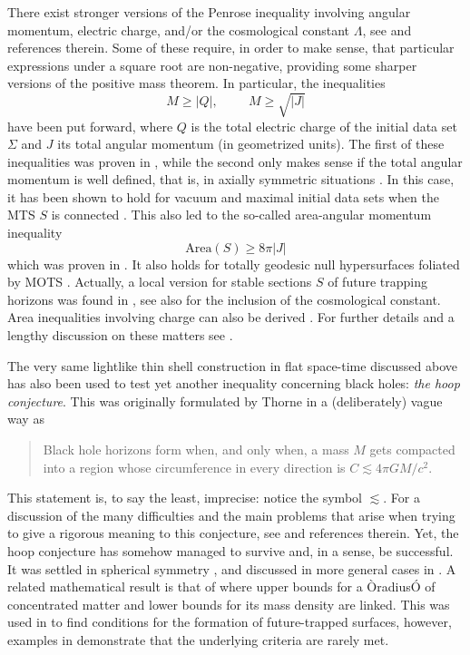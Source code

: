 \documentclass[12pt]{iopart}
\begin{document}
There exist stronger versions of the Penrose inequality involving angular momentum, electric charge, and/or the cosmological constant $\Lambda$, see \cite{Mars,Sza,JVG} and references therein. Some of these require, in order to make sense, that particular expressions under a square root are non-negative, providing some sharper versions of the positive mass theorem. In particular, the inequalities \cite{GHHP,H4,DLT,Dain}
$$
M\geq |Q| , \hspace{1cm} M\geq \sqrt{|J|}
$$
have been put forward, where $Q$ is the total electric charge of the initial data set $\Sigma$ and $J$ its total angular momentum (in geometrized units). The first of these inequalities was proven in \cite{GHHP,CRT}, while the second only makes sense if the total angular momentum is well defined, that is, in axially symmetric situations \cite{Dain,Dain2}. In this case, it has been shown to hold for vacuum and maximal initial data sets when the MTS $S$ is connected \cite{Dain1,CLW}.
This also led to the so-called area-angular momentum inequality \cite{AnP}
$$
\mbox{Area}(S) \geq 8\pi |J|
$$
which was proven in \cite{DaRe}. It also holds for totally geodesic null hypersurfaces foliated by MOTS \cite{Mars1}.  Actually, a local version for stable sections $S$ of future trapping horizons was found in \cite{JRD}, see also \cite{Simon} for the inclusion of the cosmological constant. Area inequalities involving charge can also be derived \cite{DJR,GJR}. For further details and a lengthy discussion on these matters see \cite{Dain2}.

The very same lightlike thin shell construction in flat space-time \cite{PI} discussed above has also been used \cite{PTW,Tod} to test yet another inequality concerning black holes: {\em the hoop conjecture}. This was originally formulated by Thorne in a (deliberately) vague way as \cite{Th0,MTW}
\begin{quotation}
Black hole horizons form when, and only when, a mass $M$ gets compacted into a region whose
circumference in every direction is $C\lesssim 4\pi G M /c^2$.
\end{quotation}
This statement is, to say the least, imprecise: notice the symbol $\lesssim$. For a discussion of the many difficulties and the main problems that arise when trying to give a rigorous meaning to this conjecture, see \cite{Wald1,S4} and references therein. Yet, the hoop conjecture has somehow managed to survive and, in a sense, be successful. It was settled in spherical symmetry \cite{GC4,BMO}, and discussed in more general cases in \cite{Malec}. A related mathematical result is that of \cite{SY} where upper bounds for a ÒradiusÓ of concentrated matter and lower bounds for its mass density are linked. This was used in \cite{Clar} to find conditions for the formation of future-trapped surfaces, however, examples in \cite{GC4} demonstrate that the underlying criteria are rarely met.
\end{document}
